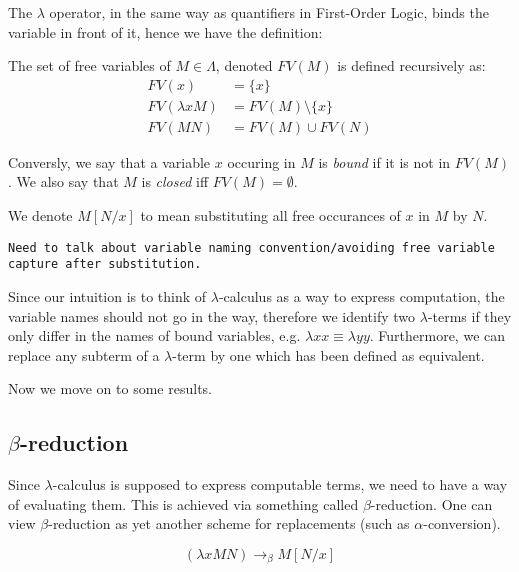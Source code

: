 The $\lambda$ operator, in the same way as quantifiers in First-Order Logic,
binds the variable in front of it, hence we have the definition:
\begin{definition}
    The set of free variables of $M \in \Lambda$, denoted $FV(M)$ is defined
    recursively as:
        \begin{align*}
            FV(x) &= \{x\} \\
            FV(\lambda x M) &= FV(M) \setminus \{x\} \\
            FV(M N) &= FV(M) \cup FV(N)
        \end{align*}
\end{definition}

Conversly, we say that a variable $x$ occuring in $M$ is \emph{bound} if it is
not in $FV(M)$. We also say that $M$ is \emph{closed} iff $FV(M) = \emptyset$.

We denote $M[N/x]$ to mean substituting all free occurances of $x$ in $M$ by $N$.

{\center \texttt{Need to talk about variable naming convention/avoiding free
    variable capture after substitution.}}

\begin{definition}
Since our intuition is to think of $\lambda$-calculus as a way to express
computation, the variable names should not go in the way, therefore we identify
two $\lambda$-terms if they only differ in the names of bound variables, e.g.
$\lambda x x \equiv \lambda y y$. Furthermore, we can replace any subterm of a
$\lambda$-term by one which has been defined as equivalent.
\end{definition}

Now we move on to some results.

\subsection{$\beta$-reduction}

Since $\lambda$-calculus is supposed to express computable terms, we need to
have a way of evaluating them. This is achieved via something called
$\beta$-reduction. One can view $\beta$-reduction as yet another scheme for
replacements (such as $\alpha$-conversion).

\begin{definition}
\[ (\lambda x M N) \rightarrow_\beta M[N/x] \]
\end{definition}

